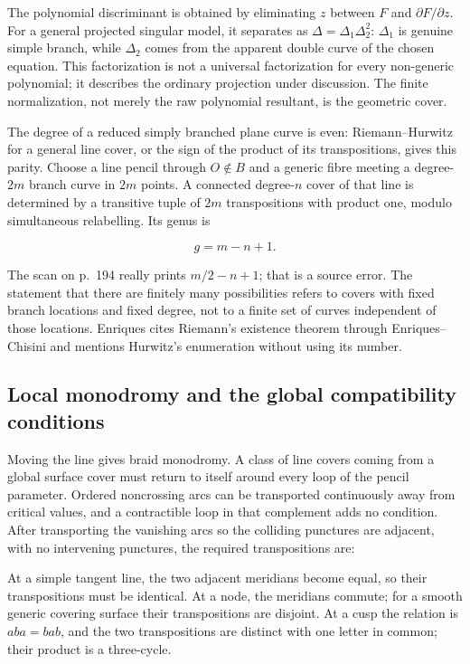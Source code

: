 The polynomial discriminant is obtained by eliminating \(z\) between \(F\) and \(\partial F/\partial z\). For a general projected singular model, it separates as \(\Delta=\Delta_1\Delta_2^2\): \(\Delta_1\) is genuine simple branch, while \(\Delta_2\) comes from the apparent double curve of the chosen equation. This factorization is not a universal factorization for every non-generic polynomial; it describes the ordinary projection under discussion. The finite normalization, not merely the raw polynomial resultant, is the geometric cover.

The degree of a reduced simply branched plane curve is even: Riemann--Hurwitz for a general line cover, or the sign of the product of its transpositions, gives this parity. Choose a line pencil through \(O\notin B\) and a generic fibre meeting a degree-\(2m\) branch curve in \(2m\) points. A connected degree-\(n\) cover of that line is determined by a transitive tuple of \(2m\) transpositions with product one, modulo simultaneous relabelling. Its genus is

\[
g=m-n+1.
\]

The scan on p.~194 really prints \(m/2-n+1\); that is a source error. The statement that there are finitely many possibilities refers to covers with fixed branch locations and fixed degree, not to a finite set of curves independent of those locations. Enriques cites Riemann's existence theorem through Enriques--Chisini and mentions Hurwitz's enumeration without using its number.

\subsection{Local monodromy and the global compatibility conditions}

Moving the line gives braid monodromy. A class of line covers coming from a global surface cover must return to itself around every loop of the pencil parameter. Ordered noncrossing arcs can be transported continuously away from critical values, and a contractible loop in that complement adds no condition. After transporting the vanishing arcs so the colliding punctures are adjacent, with no intervening punctures, the required transpositions are:

At a simple tangent line, the two adjacent meridians become equal, so their transpositions must be identical. At a node, the meridians commute; for a smooth generic covering surface their transpositions are disjoint. At a cusp the relation is \(aba=bab\), and the two transpositions are distinct with one letter in common; their product is a three-cycle.

